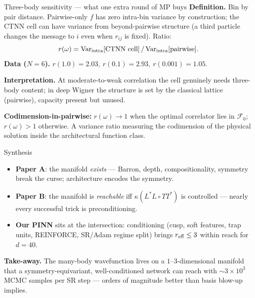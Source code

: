 \documentclass[10pt,aspectratio=169]{beamer}
\newcommand{\paperA}[1]{\textcolor{papA}{\textbf{#1}}}
\newcommand{\paperB}[1]{\textcolor{papB}{\textbf{#1}}}
\newcommand{\ours}[1]{\textcolor{ourwork}{\textbf{#1}}}
\begin{document}
\begin{frame}{Three-body sensitivity --- what one extra round of MP buys}
\small
\textbf{Definition.} Bin by pair distance. Pairwise-only $f$ has zero intra-bin variance by
construction; the CTNN cell can have variance from beyond-pairwise structure (a third particle
changes the message to $i$ even when $r_{ij}$ is fixed). Ratio:
\[
  r(\omega) = \mathrm{Var}_{\rm intra}[\text{CTNN cell}]\,/\,\mathrm{Var}_{\rm intra}[\text{pairwise}].
\]
\textbf{Data ($N{=}6$).} $r(1.0)=2.03,\ r(0.1)=2.93,\ r(0.001)=1.05$.

\vspace{2pt}
\textbf{Interpretation.} At moderate-to-weak correlation the cell genuinely needs three-body content; in
deep Wigner the structure is set by the classical lattice (pairwise), capacity present but unused.

\vspace{2pt}
\begin{tcolorbox}[colback=ourwork!8,colframe=ourwork!60,boxsep=2pt]
\small \ours{Codimension-in-pairwise:} $r(\omega)\to 1$ when the optimal correlator lies in
$\mathcal F_0$; $r(\omega)>1$ otherwise. A variance ratio measuring the codimension of the
physical solution inside the architectural function class.
\end{tcolorbox}
\end{frame}

\begin{frame}{Synthesis}
\small
\begin{itemize}\setlength\itemsep{1pt}
\item \paperA{Paper A}: the manifold \emph{exists} --- Barron, depth, compositionality, symmetry
break the curse; architecture encodes the symmetry.
\item \paperB{Paper B}: the manifold is \emph{reachable} iff $\kappa(L^\ast L\circ TT^\ast)$ is
controlled --- nearly every successful trick is preconditioning.
\item \ours{Our PINN} sits at the intersection: conditioning (cusp, soft features, trap units, REINFORCE,
SR/Adam regime split) brings $r_{\rm eff}\le 3$ within reach for $d=40$.
\end{itemize}

\vspace{4pt}
\begin{tcolorbox}[colback=ourwork!8,colframe=ourwork!60,boxsep=2pt]
\small\textbf{Take-away.} The many-body wavefunction lives on a $1$--$3$-dimensional manifold that a
symmetry-equivariant, well-conditioned network can reach with $\sim 3\times 10^3$ MCMC samples per
SR step --- orders of magnitude better than basis blow-up implies.
\end{tcolorbox}
\end{frame}
\end{document}
